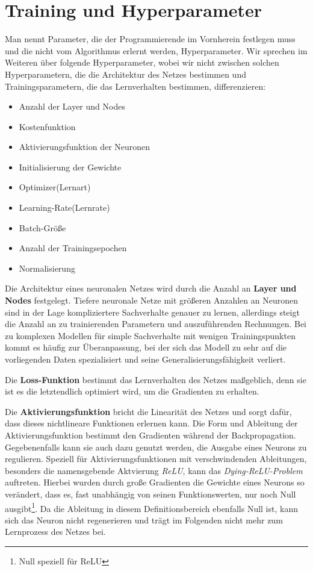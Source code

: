 \section{Training und Hyperparameter}
Man nennt Parameter, die der Programmierende im Vornherein festlegen muss und die nicht vom Algorithmus erlernt werden, Hyperparameter. Wir sprechen im Weiteren über folgende Hyperparameter, wobei wir nicht zwischen solchen Hyperparametern, die die Architektur des Netzes bestimmen und Trainingsparametern, die das Lernverhalten bestimmen, differenzieren:
\begin{multicols}{2}
	\begin{itemize}
		\setlength\itemsep{0.1cm}
		\setlength{\parskip}{0.1cm}
		\item Anzahl der Layer und Nodes
		\item Kostenfunktion
		\item Aktivierungsfunktion der Neuronen
		\item Initialisierung der Gewichte
		\item Optimizer(Lernart) 
		\item Learning-Rate(Lernrate)
		\item Batch-Größe
		\item Anzahl der Trainingsepochen
		\item Normalisierung
	\end{itemize}
\end{multicols}
Die Architektur eines neuronalen Netzes wird durch die Anzahl an \textbf{Layer und Nodes} festgelegt.
Tiefere neuronale Netze mit größeren Anzahlen an Neuronen sind in der Lage kompliziertere Sachverhalte genauer zu lernen, allerdings steigt die Anzahl an zu trainierenden Parametern und auszuführenden Rechnungen. Bei zu komplexen Modellen für simple Sachverhalte mit wenigen Trainingspunkten kommt es häufig zur Überanpassung, bei der sich das Modell zu sehr auf die vorliegenden Daten spezialisiert und seine Generalisierungsfähigkeit verliert.

Die \textbf{Loss-Funktion} bestimmt das Lernverhalten des Netzes maßgeblich, denn sie ist es die letztendlich optimiert wird, um die Gradienten zu erhalten. 

Die \textbf{Aktivierungsfunktion} bricht die Linearität des Netzes und sorgt dafür, dass dieses nichtlineare Funktionen erlernen kann.  Die Form und Ableitung der Aktivierungsfunktion bestimmt den Gradienten während der Backpropagation. Gegebenenfalls kann sie auch dazu genutzt werden, die Ausgabe eines Neurons zu regulieren. Speziell für Aktivierungsfunktionen mit verschwindenden Ableitungen, besonders die namensgebende Aktvierung \textit{ReLU}, kann das \textit{Dying-ReLU-Problem} auftreten. Hierbei wurden durch große Gradienten die Gewichte eines Neurons so verändert, dass es, fast unabhängig von seinen Funktionswerten, nur noch Null ausgibt\footnote{Null speziell für ReLU}. Da die Ableitung in diesem Definitionsbereich ebenfalls Null ist, kann sich das Neuron nicht regenerieren und trägt im Folgenden nicht mehr zum Lernprozess des Netzes bei.

